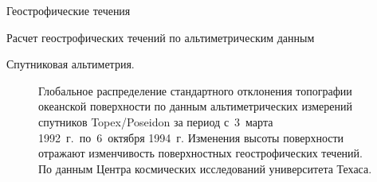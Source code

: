 \begin{chapter}{Геострофические течения}
\begin{section}{Расчет геострофических течений по альтиметрическим данным}
\begin{paragraph}{Спутниковая альтиметрия.}
\begin{figure}[t!]
\caption{Глобальное распределение стандартного отклонения топографии
океанской поверхности по данным альтиметрических измерений
спутников Topex/Poseidon
за период с~3~марта 1992~г.\ по~6~октября 1994~г. 
Изменения высоты поверхности отражают изменчивость поверхностных
геострофических течений. 
По данным Центра космических исследований университета Техаса.}
\label{fig:sshvariability}
\end{figure}
%


\end{paragraph}
\end{section}
\end{chapter}

